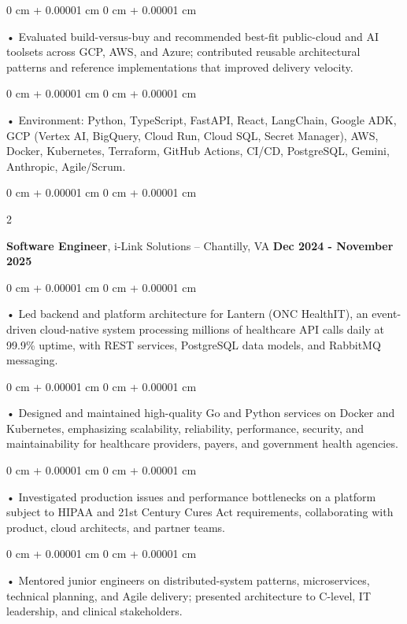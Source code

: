 \documentclass[10pt, letterpaper]{article}
\newenvironment{onecolentry}{
    \begin{adjustwidth}{
        0 cm + 0.00001 cm
    }{
        0 cm + 0.00001 cm
    }
}{
    \end{adjustwidth}
} %
\newenvironment{twocolentry}[2][]{
    \onecolentry
    \def\secondColumn{#2}
    \setcolumnwidth{\fill, 4.5 cm}
    \begin{paracol}{2}
}{
    \switchcolumn \raggedleft \secondColumn
    \end{paracol}
    \endonecolentry
} %
\begin{document}
        \begin{onecolentry}
             • Evaluated build-versus-buy and recommended best-fit public-cloud and AI toolsets across GCP, AWS, and Azure; contributed reusable architectural patterns and reference implementations that improved delivery velocity.
        \end{onecolentry}
        \begin{onecolentry}
             • Environment: Python, TypeScript, FastAPI, React, LangChain, Google ADK, GCP (Vertex AI, BigQuery, Cloud Run, Cloud SQL, Secret Manager), AWS, Docker, Kubernetes, Terraform, GitHub Actions, CI/CD, PostgreSQL, Gemini, Anthropic, Agile/Scrum.
        \end{onecolentry}

        \vspace{0.1cm}

        \begin{twocolentry}{
            \textbf{Dec 2024 - November 2025}
        }
            \textbf{Software Engineer}, i-Link Solutions -- Chantilly, VA\end{twocolentry}


        \begin{onecolentry}
             • Led backend and platform architecture for Lantern (ONC HealthIT), an event-driven cloud-native system processing millions of healthcare API calls daily at 99.9\% uptime, with REST services, PostgreSQL data models, and RabbitMQ messaging.
        \end{onecolentry}
        \begin{onecolentry}
             • Designed and maintained high-quality Go and Python services on Docker and Kubernetes, emphasizing scalability, reliability, performance, security, and maintainability for healthcare providers, payers, and government health agencies.
        \end{onecolentry}
        \begin{onecolentry}
             • Investigated production issues and performance bottlenecks on a platform subject to HIPAA and 21st Century Cures Act requirements, collaborating with product, cloud architects, and partner teams.
        \end{onecolentry}
        \begin{onecolentry}
             • Mentored junior engineers on distributed-system patterns, microservices, technical planning, and Agile delivery; presented architecture to C-level, IT leadership, and clinical stakeholders.
        \end{onecolentry}
\end{document}
